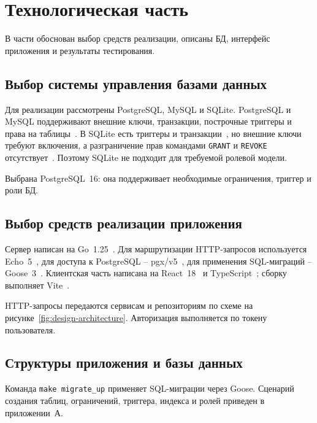 \chapter{Технологическая часть}

В части обоснован выбор средств реализации, описаны БД, интерфейс приложения и результаты тестирования.

\section{Выбор системы управления базами данных}

Для реализации рассмотрены PostgreSQL, MySQL и SQLite. PostgreSQL и MySQL поддерживают внешние ключи, транзакции, построчные триггеры и права на таблицы~\cite{postgresql-features,postgresql-privileges,mysql-privileges,mysql-transactions}. В SQLite есть триггеры и транзакции~\cite{sqlite-triggers,sqlite-transactions}, но внешние ключи требуют включения, а разграничение прав командами \texttt{GRANT} и \texttt{REVOKE} отсутствует~\cite{sqlite-foreign-keys,sqlite-omitted}. Поэтому SQLite не подходит для требуемой ролевой модели.

Выбрана PostgreSQL~16: она поддерживает необходимые ограничения, триггер и роли БД.

\section{Выбор средств реализации приложения}

Сервер написан на Go~1.25~\cite{go-docs}. Для маршрутизации HTTP-запросов используется Echo~5~\cite{echo-docs}, для доступа к PostgreSQL -- pgx/v5~\cite{pgx-docs}, для применения SQL-миграций -- Goose~3~\cite{goose-docs}. Клиентская часть написана на React~18~\cite{react-docs} и TypeScript~\cite{typescript-docs}; сборку выполняет Vite~\cite{vite-docs}.

HTTP-запросы передаются сервисам и репозиториям по схеме на рисунке~\ref{fig:design-architecture}. Авторизация выполняется по токену пользователя.

\section{Структуры приложения и базы данных}

Команда \texttt{make migrate\_up} применяет SQL-миграции через Goose. Сценарий создания таблиц, ограничений, триггера, индекса и ролей приведен в приложении~А.

